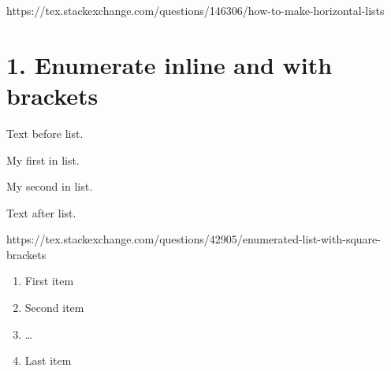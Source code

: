\documentclass{article}
\begin{document}
https://tex.stackexchange.com/questions/146306/how-to-make-horizontal-lists
\section{1. Enumerate inline and with brackets }
Text before list.
\begin{enumerate*}
  \item My first in list.
  \item My second in list.
\end{enumerate*}
Text after list.

https://tex.stackexchange.com/questions/42905/enumerated-list-with-square-brackets
\begin{enumerate}[label={(\arabic*)}]
    \item First item
    \item Second item
    \item \ldots
    \item Last item
  \end{enumerate}
\end{document}

